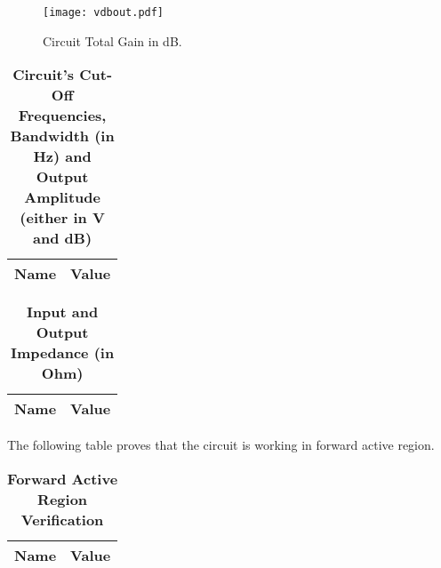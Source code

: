 \begin{figure}[h] 
\centering
\texttt{[image: vdbout.pdf]}
\caption{Circuit Total Gain in dB.}
\label{Fig4: SimGaindB}
\end{figure}

\begin{table}[H]
\centering
\begin{tabular}{|l|l|}
\hline
{\bf Name} & {\bf Value} \\ \hline
    
\end{tabular}
\caption{\textbf{Circuit's Cut-Off Frequencies, Bandwidth (in Hz) and Output Amplitude (either in V and dB)}}
\end{table}

\begin{table}[H]
\centering
\begin{tabular}{|l|l|}
\hline
{\bf Name} & {\bf Value} \\ \hline
    
    
\end{tabular}
\caption{\textbf{Input and Output Impedance (in Ohm) }}
\end{table}

The following table proves that the circuit is working in forward active region.

\begin{table}[H]
\centering
\begin{tabular}{|l|l|}
\hline
{\bf Name} & {\bf Value} \\ \hline
    
\end{tabular}
\caption{\textbf{Forward Active Region Verification}}
\end{table}
